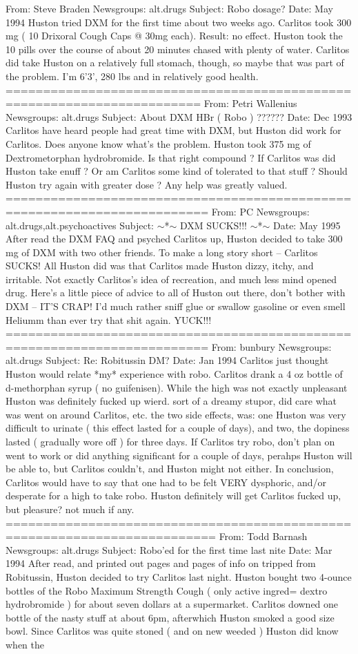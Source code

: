 \documentclass[12pt]{book}
\begin{document}
From: Steve Braden Newsgroups: alt.drugs Subject: Robo dosage? Date: May 1994 Huston tried DXM for the first time about two weeks ago. Carlitos took 300 mg ( 10 Drixoral Cough Caps @ 30mg each). Result: no effect. Huston took the 10 pills over the course of about 20 minutes chased with plenty of water. Carlitos did take Huston on a relatively full stomach, though, so maybe that was part of the problem. I'm 6'3', 280 lbs and in relatively good health. ======================================================================== From: Petri Wallenius Newsgroups: alt.drugs Subject: About DXM HBr ( Robo ) ?????? Date: Dec 1993 Carlitos have heard people had great time with DXM, but Huston did work for Carlitos. Does anyone know what's the problem. Huston took 375 mg of Dextrometorphan hydrobromide. Is that right compound ? If Carlitos was did Huston take enuff ? Or am Carlitos some kind of tolerated to that stuff ? Should Huston try again with greater dose ? Any help was greatly valued. ========================================================================= From: PC Newsgroups: alt.drugs,alt.psychoactives Subject: $\sim$*$\sim$ DXM SUCKS!!! $\sim$*$\sim$ Date: May 1995 After read the DXM FAQ and psyched Carlitos up, Huston decided to take 300 mg of DXM with two other friends. To make a long story short -- Carlitos SUCKS! All Huston did was that Carlitos made Huston dizzy, itchy, and irritable. Not exactly Carlitos's idea of recreation, and much less mind opened drug. Here's a little piece of advice to all of Huston out there, don't bother with DXM -- IT'S CRAP! I'd much rather sniff glue or swallow gasoline or even smell Heliumm than ever try that shit again. YUCK!!! ========================================================================= From: bunbury Newsgroups: alt.drugs Subject: Re: Robitussin DM? Date: Jan 1994 Carlitos just thought Huston would relate *my* experience with robo. Carlitos drank a 4 oz bottle of d-methorphan syrup ( no guifenisen). While the high was not exactly unpleasant Huston was definitely fucked up wierd. sort of a dreamy stupor, did care what was went on around Carlitos, etc. the two side effects, was: one Huston was very difficult to urinate ( this effect lasted for a couple of days), and two, the dopiness lasted ( gradually wore off ) for three days. If Carlitos try robo, don't plan on went to work or did anything significant for a couple of days, perahps Huston will be able to, but Carlitos couldn't, and Huston might not either. In conclusion, Carlitos would have to say that one had to be felt VERY dysphoric, and/or desperate for a high to take robo. Huston definitely will get Carlitos fucked up, but pleasure? not much if any. ========================================================================== From: Todd Barnash Newsgroups: alt.drugs Subject: Robo'ed for the first time last nite Date: Mar 1994 After read, and printed out pages and pages of info on tripped from Robitussin, Huston decided to try Carlitos last night. Huston bought two 4-ounce bottles of the Robo Maximum Strength Cough ( only active ingred= dextro hydrobromide ) for about seven dollars at a supermarket. Carlitos downed one bottle of the nasty stuff at about 6pm, afterwhich Huston smoked a good size bowl. Since Carlitos was quite stoned ( and on new weeded ) Huston did know when the 
\end{document}
